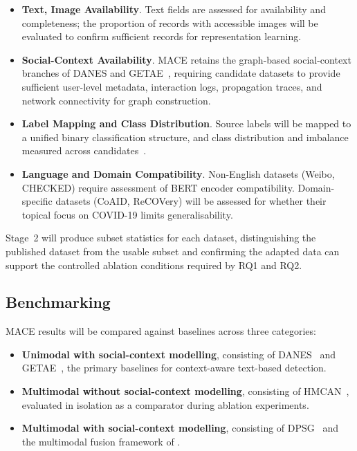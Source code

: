 \begin{itemize}

    \item \textbf{Text, Image Availability}. Text fields are assessed for availability and completeness; the proportion of records with accessible images will be evaluated to confirm sufficient records for representation learning.

    \item \textbf{Social-Context Availability}. MACE retains the graph-based social-context branches of DANES and GETAE~\citep{truica2024danes, GETAE2025, Song2021}, requiring candidate datasets to provide sufficient user-level metadata, interaction logs, propagation traces, and network connectivity for graph construction.

    \item \textbf{Label Mapping and Class Distribution}. Source labels will be mapped to a unified binary classification structure, and class distribution and imbalance measured across candidates~\citep{Xue2021, mumindataset}.

    \item \textbf{Language and Domain Compatibility}. Non-English datasets (Weibo, CHECKED) require assessment of BERT encoder compatibility. Domain-specific datasets (CoAID, ReCOVery) will be assessed for whether their topical focus on COVID-19 limits generalisability.

\end{itemize}

Stage~2 will produce subset statistics for each dataset, distinguishing the published dataset from the usable subset and confirming the adapted data can support the controlled ablation conditions required by RQ1 and RQ2.

\subsection{Benchmarking}

MACE results will be compared against baselines across three categories:

\begin{itemize}
    \item \textbf{Unimodal with social-context modelling}, consisting of DANES~\citep{truica2024danes} and GETAE~\citep{GETAE2025}, the primary baselines for context-aware text-based detection.

    \item \textbf{Multimodal without social-context modelling}, consisting of HMCAN~\citep{Qian2021}, evaluated in isolation as a comparator during ablation experiments.

    \item \textbf{Multimodal with social-context modelling}, consisting of DPSG~\citep{jing2025} and the multimodal fusion framework of \citet{Dellys2025}.
\end{itemize}


